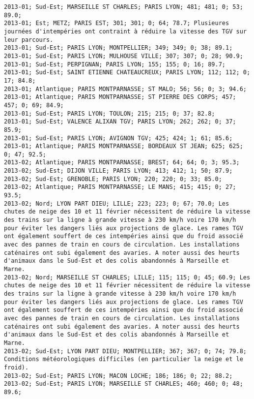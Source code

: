 \documentclass{article}
\begin{document}
\begin{Verbatim}[commandchars=\\\{\}]
2013-01; Sud-Est; MARSEILLE ST CHARLES; PARIS LYON; 481; 481; 0; 53; 89.0; 
2013-01; Est; METZ; PARIS EST; 301; 301; 0; 64; 78.7; Plusieures journées d'intempéries ont contraint à réduire la vitesse des TGV sur leur parcours.
2013-01; Sud-Est; PARIS LYON; MONTPELLIER; 349; 349; 0; 38; 89.1; 
2013-01; Sud-Est; PARIS LYON; MULHOUSE VILLE; 307; 307; 0; 28; 90.9; 
2013-01; Sud-Est; PERPIGNAN; PARIS LYON; 155; 155; 0; 16; 89.7; 
2013-01; Sud-Est; SAINT ETIENNE CHATEAUCREUX; PARIS LYON; 112; 112; 0; 17; 84.8; 
2013-01; Atlantique; PARIS MONTPARNASSE; ST MALO; 56; 56; 0; 3; 94.6; 
2013-01; Atlantique; PARIS MONTPARNASSE; ST PIERRE DES CORPS; 457; 457; 0; 69; 84.9; 
2013-01; Sud-Est; PARIS LYON; TOULON; 215; 215; 0; 37; 82.8; 
2013-01; Sud-Est; VALENCE ALIXAN TGV; PARIS LYON; 262; 262; 0; 37; 85.9; 
2013-01; Sud-Est; PARIS LYON; AVIGNON TGV; 425; 424; 1; 61; 85.6; 
2013-01; Atlantique; PARIS MONTPARNASSE; BORDEAUX ST JEAN; 625; 625; 0; 47; 92.5; 
2013-02; Atlantique; PARIS MONTPARNASSE; BREST; 64; 64; 0; 3; 95.3; 
2013-02; Sud-Est; DIJON VILLE; PARIS LYON; 413; 412; 1; 50; 87.9; 
2013-02; Sud-Est; GRENOBLE; PARIS LYON; 220; 220; 0; 33; 85.0; 
2013-02; Atlantique; PARIS MONTPARNASSE; LE MANS; 415; 415; 0; 27; 93.5; 
2013-02; Nord; LYON PART DIEU; LILLE; 223; 223; 0; 67; 70.0; Les chutes de neige des 10 et 11 février nécessitent de réduire la vitesse des trains sur la ligne à grande vitesse à 230 km/h voire 170 km/h pour éviter les dangers liés aux projections de glace. Les rames TGV ont également souffert de ces intempéries ainsi que du froid associé avec des pannes de train en cours de circulation. Les installations caténaires ont subi également des avaries. A noter aussi des heurts d'animaux dans le Sud-Est et des colis abandonnés à Marseille et Marne.
2013-02; Nord; MARSEILLE ST CHARLES; LILLE; 115; 115; 0; 45; 60.9; Les chutes de neige des 10 et 11 février nécessitent de réduire la vitesse des trains sur la ligne à grande vitesse à 230 km/h voire 170 km/h pour éviter les dangers liés aux projections de glace. Les rames TGV ont également souffert de ces intempéries ainsi que du froid associé avec des pannes de train en cours de circulation. Les installations caténaires ont subi également des avaries. A noter aussi des heurts d'animaux dans le Sud-Est et des colis abandonnés à Marseille et Marne.
2013-02; Sud-Est; LYON PART DIEU; MONTPELLIER; 367; 367; 0; 74; 79.8; Conditions météorologiques difficiles (en particulier la neige et le froid).
2013-02; Sud-Est; PARIS LYON; MACON LOCHE; 186; 186; 0; 22; 88.2; 
2013-02; Sud-Est; PARIS LYON; MARSEILLE ST CHARLES; 460; 460; 0; 48; 89.6; 

\end{Verbatim}
\end{document}
